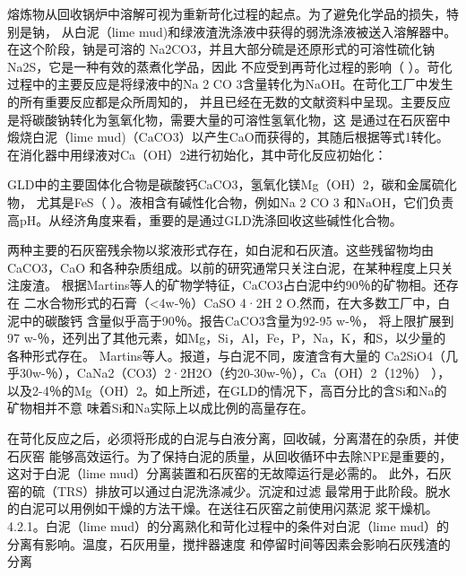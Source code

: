 \documentclass[11pt]{article}
\begin{document}
\nocite{poykio14_evaluat_bio_acces_non_proces, maekitalo14_charac_green_liquor_dregs_poten, jia13_use_amend_tailin_as_mine_waste_cover
, jia14_metal_mobil_tailin_cover_with, edmondson14_urban_cultiv_allot_maint_soil, buruberri15_prepar_clink_from_paper_pulp_indus_wastes,
 brunelle15_evaluat_impac_risin_fertil_prices_crop_yield, andreola11_model_simul_analy_react_system,
  ragnvaldsson14_novel_method_reduc_acid_mine, zhang15_lime_mud_from_paper_proces, zhang14_anaer_diges_food_waste_stabil}

熔炼物从回收锅炉中溶解可视为重新苛化过程的起点。为了避免化学品的损失，特别是钠，
从白泥（lime mud)和绿液渣洗涤液中获得的弱洗涤液被送入溶解器中。在这个阶段，钠是可溶的
Na2CO3，并且大部分硫是还原形式的可溶性硫化钠Na2S，它是一种有效的蒸煮化学品，因此
不应受到再苛化过程的影响（\cite{Handbook_of_pulp} ）。苛化过程中的主要反应是将绿液中的Na 2 CO
3含量转化为NaOH。在苛化工厂中发生的所有重要反应都是众所周知的，
并且已经在无数的文献资料中呈现。主要反应是将碳酸钠转化为氢氧化物，需要大量的可溶性氢氧化物，这
是通过在石灰窑中煅烧白泥（lime mud)（CaCO3）以产生CaO而获得的，其随后根据等式1转化。
在消化器中用绿液对Ca（OH）2进行初始化，其中苛化反应初始化：

GLD中的主要固体化合物是碳酸钙CaCO3，氢氧化镁Mg（OH）2，碳和金属硫化物，
尤其是FeS（\cite{maekitalo14_charac_green_liquor_dregs_poten} ）。液相含有碱性化合物，例如Na 2 CO 3
和NaOH，它们负责高pH。从经济角度来看，重要的是通过GLD洗涤回收这些碱性化合物。\cite{Kinnarinen_2016}

两种主要的石灰窑残余物以浆液形式存在，如白泥和石灰渣。这些残留物均由CaCO3，CaO
和各种杂质组成。以前的研究通常只关注白泥，在某种程度上只关注废渣。
根据Martins等人的矿物学特征，CaCO3占白泥中约90％的矿物相。还存在
二水合物形式的石膏（<4w-％）CaSO 4·2H 2 O.然而，在大多数工厂中，白泥中的碳酸钙
含量似乎高于90％。报告CaCO3含量为92-95 w-％，
将上限扩展到97 w-％，还列出了其他元素，如Mg，Si，Al，Fe，P，Na，K，和S，以少量的
各种形式存在。 Martins等人。报道，与白泥不同，废渣含有大量的
Ca2SiO4（几乎30w-％），CaNa2（CO3）2·2H2O（约20-30w-％），Ca（OH）2（12％） ），
以及2-4％的Mg（OH）2。如上所述，在GLD的情况下，高百分比的含Si和Na的矿物相并不意
味着Si和Na实际上以成比例的高量存在。\cite{Kinnarinen_2016}

在苛化反应之后，必须将形成的白泥与白液分离，回收碱，分离潜在的杂质，并使石灰窑
能够高效运行。为了保持白泥的质量，从回收循环中去除NPE是重要的，这对于白泥（lime mud）分离装置和石灰窑的无故障运行是必需的。
此外，石灰窑的硫（TRS）排放可以通过白泥洗涤减少。沉淀和过滤
最常用于此阶段。脱水的白泥可以用例如干燥的方法干燥。在送往石灰窑之前使用闪蒸泥
浆干燥机。 4.2.1。白泥（lime mud）的分离熟化和苛化过程中的条件对白泥（lime mud）的分离有影响。温度，石灰用量，搅拌器速度
和停留时间等因素会影响石灰残渣的分离
\end{document}
